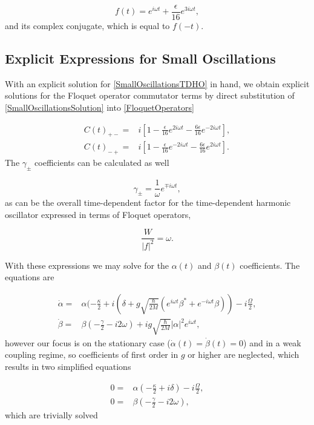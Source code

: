 \documentclass[reprint, amsmath,amssymb, aps,pra]{revtex4-1}
\begin{document}
\begin{equation}\label{SmallOscillationsSolution}
f(t)=  e^{i\omega t} + \frac{\epsilon}{16} e^{3i\omega t},
\end{equation} and its complex conjugate, which is equal to $f(-t)$. 

\subsection{Explicit Expressions for Small Oscillations}

	With an explicit solution for \eqref{SmallOscillationsTDHO} in hand, we obtain explicit solutions for the Floquet operator commutator terms by direct substitution of \eqref{SmallOscillationsSolution} into \eqref{FloquetOperators} \cite{TesisMaestria}

\begin{align}
C(t)_{+-} =& i [1 -\frac{\epsilon}{16}e^{2i\omega t}-\frac{6\epsilon}{16}e^{-2i\omega t}],\\
C(t)_{-+} =& i [1 -\frac{\epsilon}{16}e^{-2i\omega t}-\frac{6\epsilon}{16}e^{2i\omega t}].
\end{align} The $\gamma_{\pm}$ coefficients can be calculated as well

\begin{equation}
\gamma_\pm= \frac{1}{\omega}e^{\mp i\omega t},
\end{equation} as can be the overall time-dependent factor for the time-dependent harmonic oscillator expressed in terms of Floquet operators,

\begin{equation}
\frac{W}{|f|^2} = \omega.
\end{equation} 

With these expressions we may solve for the $\alpha(t)$ and $\beta(t)$ coefficients. The equations are

\begin{align}
\dot{\alpha} =& \alpha(-\frac{\kappa}{2}+i(\delta+g\sqrt{\frac{\hbar}{2M}}(e^{i\omega t} \beta^* + e^{-i\omega t} \beta))-i\frac{\Omega}{2},\\
\dot{\beta} =& \beta(-\frac{\gamma}{2}-i 2\omega)+ig\sqrt{\frac{\hbar}{2M}}|\alpha|^2e^{i\omega t},
\end{align}
however our focus is on the stationary case
($\dot{\alpha}(t)=\dot{\beta}(t)=0$) and in a weak coupling regime, so
coefficients of first order in $g$ or higher are neglected, which
results in two simplified equations

\begin{align}
0 =& \alpha(-\frac{\kappa}{2}+i\delta)-i\frac{\Omega}{2},\\
0 =& \beta(-\frac{\gamma}{2}-i 2\omega),
\end{align} which are trivially solved 
\end{document}
